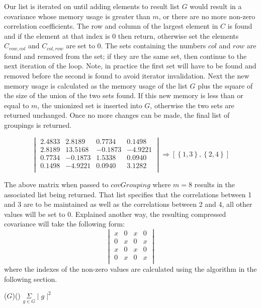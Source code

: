 \documentclass[11pt]{article}
\begin{document}
Our list is iterated on until adding elements to result list $G$ would result in a covariance whose memory usage is greater than $m$, or there are no more non-zero correlation coefficients.
The row and column of the largest element in $C$ is found and if the element at that index is $0$ then return, otherwise set the elements $C_{row,col}$ and $C_{col,row}$ are set to $0$. 
The sets containing the numbers $col$ and $row$ are found and removed from the set; if they are the same set, then continue to the next iteration of the loop. 
Note, in practice the first set will have to be found and removed before the second is found to avoid iterator invalidation. 
Next the new memory usage is calculated as the memory usage of the list $G$ plus the square of the size of the union of the two sets found. 
If this new memory is less than or equal to $m$, the unionized set is inserted into $G$, otherwise the two sets are returned unchanged. 
Once no more changes can be made, the final list of groupings is returned. 

\begin{figure}[h]
$$
\begin{vmatrix}
	2.4833 & 2.8189  &  0.7734  &  0.1498 \\
    2.8189 & 13.5168 & -0.1873  & -4.9221 \\
    0.7734 & -0.1873 &  1.5338  &  0.0940 \\
    0.1498 & -4.9221 &  0.0940  &  3.1282 \\
\end{vmatrix}
\Rightarrow 
\left[\left\{1,3\right\},\left\{2,4\right\}\right]
$$
\end{figure}

The above matrix when passed to $covGrouping$ where $m = 8$ results in the associated list being returned. 
That list specifies that the correlations between 1 and 3 are to be maintained as well as the correlations between 2 and 4, all other values will be set to $0$. 
Explained another way, the resulting compressed covariance will take the following form:
$$
\begin{vmatrix}
	x & 0 & x & 0 \\
	0 & x & 0 & x \\
	x & 0 & x & 0 \\
	0 & x & 0 & x \\
\end{vmatrix}
$$
where the indexes of the non-zero values are calculated using the algorithm in the following section. 

\begin{algorithm}

\memoryUsage($G$)\Begin() {
	\Return $\underset{g \in G}{\Sigma}\mid g \mid^2$
}
	
\end{algorithm}
\end{document}
